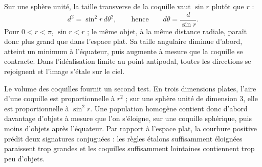 Sur une sphère unité, la taille transverse de la coquille vaut \(\sin r\) plutôt que \(r\) :
\begin{equation}
d^2 = \sin^2 r\, d\theta^2,
\qquad\text{hence}\qquad
d\theta = \frac{d}{\sin r}.
\label{eq:c03-spherical-angle}
\end{equation}
Pour \(0<r<\pi\), \(\sin r<r\) ; le même objet, à la même distance radiale, paraît donc plus grand que dans l’espace plat. Sa taille angulaire diminue d’abord, atteint un minimum à l’équateur, puis augmente à mesure que la coquille se contracte. Dans l’idéalisation limite au point antipodal, toutes les directions se rejoignent et l’image s’étale sur le ciel.

\begin{classroomqa}
\end{classroomqa}

Le volume des coquilles fournit un second test. En trois dimensions plates, l’aire d’une coquille est proportionnelle à \(r^2\) ; sur une sphère unité de dimension \(3\), elle est proportionnelle à \(\sin^2r\). Une population homogène contient donc d’abord davantage d’objets à mesure que l’on s’éloigne, sur une coquille sphérique, puis moins d’objets après l’équateur. Par rapport à l’espace plat, la courbure positive prédit deux signatures conjuguées : les règles étalons suffisamment éloignées paraissent trop grandes et les coquilles suffisamment lointaines contiennent trop peu d’objets.

